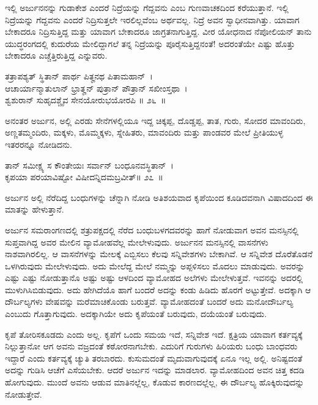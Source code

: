ಇಲ್ಲಿ ಅರ್ಜುನನನ್ನು ಗುಡಾಕೇಶ ಎಂದರೆ ನಿದ್ರೆಯನ್ನು ಗೆದ್ದವನು ಎಂಬ ಗುಣವಾಚಕದಿಂದ ಕರೆಯುತ್ತಾನೆ. ಇಲ್ಲಿ ನಿದ್ರೆಯನ್ನು ಗೆದ್ದವನು ಎಂದರೆ ನಿದ್ರಿಸುತ್ತಲೇ ಇರಲಿಲ್ಲವೆಂಬ ಅರ್ಥವಲ್ಲ. ನಿದ್ರೆ ಅವನ ಸ್ವಾಧೀನವಾಗಿತ್ತು. ಯಾವಾಗ ಬೇಕಾದರೂ ನಿದ್ರಿಸುತ್ತಿದ್ದ ಮತ್ತು ಯಾವಾಗ ಬೇಕಾದರೂ ಜಾಗ್ರತನಾಗುತ್ತಿದ್ದ. ವೀರ ಯೋಧನಾದ ನೆಪೋಲಿಯನ್ ತಾನು ಯುದ್ಧರಂಗದಲ್ಲಿ ಕುದುರೆಯ ಮೇಲಿದ್ದಾಗಲೆ ತನ್ನ ನಿದ್ರೆಯನ್ನು ಪೂರೈಸುತ್ತಿದ್ದನಂತೆ! ಅದರಂತೆಯೇ ಎಷ್ಟು ಹೊತ್ತು ಬೇಕಾದರೂ ಎಚ್ಚೆತ್ತಿರುತ್ತಿದ್ದ ಎನ್ನುವರು.

\begin{shloka}
ತತ್ರಾಪಶ್ಯತ್ ಸ್ಥಿತಾನ್ ಪಾರ್ಥ ಪಿತೄನಥ ಪಿತಾಮಹಾನ್~।\\ಆಚಾರ್ಯಾನ್ಮಾತುಲಾನ್ ಭ್ರಾತೄನ್ ಪುತ್ರಾನ್ ಪೌತ್ರಾನ್ ಸಖೀಂಸ್ತಥಾ~।\\ಶ್ವಶುರಾನ್ ಸುಹೃದಶ್ಚೈವ ಸೇನಯೋರುಭಯೋರಪಿ \hfill॥ ೨೬~॥
\end{shloka}

\begin{artha}
ಅನಂತರ ಅರ್ಜುನ, ಅಲ್ಲಿ ಎರಡು ಸೇನೆಗಳಲ್ಲಿಯೂ ಇದ್ದ ಚಿಕ್ಕಪ್ಪ, ದೊಡ್ಡಪ್ಪ, ತಾತ, ಗುರು, ಸೋದರ ಮಾವಂದಿರು, ಅಣ್ಣತಮ್ಮಂದಿರು, ಮಕ್ಕಳು, ಮೊಮ್ಮಕ್ಕಳು, ಸ್ನೇಹಿತರು, ಮಾವಂದಿರು ಮತ್ತು ಪಾಂಡವರ ಮೇಲೆ ಪ್ರೀತಿಯುಳ್ಳ ಇತರರನ್ನೂ ನೋಡಿದನು.
\end{artha}

\begin{shloka}
ತಾನ್ ಸಮೀಕ್ಷ್ಯ ಸ ಕೌಂತೇಯಃ ಸರ್ವಾನ್ ಬಂಧೂನವಸ್ಥಿತಾನ್~।\\ಕೃಪಯಾ ಪರಯಾವಿಷ್ಟೋ ವಿಷೀದನ್ನಿದಮಬ್ರವೀತ್\hfill॥ ೨೭~॥
\end{shloka}

\begin{artha}
ಅರ್ಜುನ ಅಲ್ಲಿ ನೆರೆದಿದ್ದ ಬಂಧುಗಳನ್ನು ಚೆನ್ನಾಗಿ ನೋಡಿ ಅತಿಶಯವಾದ ಕೃಪೆಯಿಂದ ಕೂಡಿದವನಾಗಿ ವಿಷಾದದಿಂದ ಈ ಮಾತನ್ನು ಹೇಳುತ್ತಾನೆ.
\end{artha}

ಅರ್ಜುನ ಸಮರಾಂಗಣದಲ್ಲಿ ಶತ್ರುಪಕ್ಷದಲ್ಲಿ ನೆರೆದ ಬಂಧುಬಳಗದವರನ್ನು ಹಾಗೆ ನೋಡುವಾಗ ಅವನ ಮನಸ್ಸಿನಲ್ಲಿ ಸುಪ್ತವಾಗಿದ್ದ ಅವರ ಮೇಲಿನ ವ್ಯಾಮೋಹವೆಲ್ಲ ಮೇಲೇಳುವುದು. ಅರ್ಜುನನ ಮನಸ್ಸಿನಲ್ಲಿ ವಾಸನೆಗಳು ನಾಶವಾಗಿರಲಿಲ್ಲ. ಆ ವಾಸನೆಗಳನ್ನು ಮೇಲಕ್ಕೆ ಎಬ್ಬಿಸಲು ಕೆಲವು ಸನ್ನಿವೇಶಗಳು ಬೇಕಾಗಿವೆ. ಆ ಸನ್ನಿವೇಶ ದೊರೆತೊಡನೆ ಒಳಗಿರುವುದು ಮೇಲೇಳುವುದು. ಅದು ಮೇಲೆದ್ದ ಮೇಲೆ ನಮ್ಮನ್ನು ಅಪ್ಪಳಿಸಲು ಮೊದಲು ಮಾಡುವುದು. ಅವರನ್ನು ಎಷ್ಟು ಎಷ್ಟು ನೋಡುತ್ತಾನೊ ಅಷ್ಟು ಅಷ್ಟು ಆಳದಿಂದ ವ್ಯಾಮೋಹದ ಅಲೆಗಳು ಮೇಲೇಳುತ್ತವೆ. ಇವನನ್ನು ಅದರಲ್ಲಿ ಮುಳುಗಿಸಿಬಿಡುವುದು. ಅದು ಹೇಗಿದೆಯೊ ಹಾಗೆ ಬಂದರೆ ಅದನ್ನು ಕಂಡು ಹಿಡಿದು ಹೊರಗೆ ಅಟ್ಟುತ್ತೇವೆ. ಅದಕ್ಕಾಗಿ ಆ ದೌರ್ಬಲ್ಯಗಳು ವೇಷವನ್ನು ಮರೆಮಾಚಿಕೊಂಡು ಬರುತ್ತವೆ. ವ್ಯಾಮೋಹದಂತೆ ಬಂದರೆ ಅದು ಮನೋದೌರ್ಬಲ್ಯ ಎಂಬುದು ಗೊತ್ತಾಗುವುದು. ಅದಕ್ಕಾಗಿಯೇ ಅದು ಕೃಪೆಯಂತೆ ಬರುವುದು, ದಯೆಯಂತೆ ಬರುವುದು.

ಕೃಪೆ ತೋರಿಸಕೂಡದು ಎಂದು ಅಲ್ಲ. ಕೃಪೆಗೆ ಒಂದು ಸಮಯ ಇದೆ, ಸನ್ನಿವೇಶ ಇದೆ. ಕ್ಷತ್ರಿಯ ಯಾವಾಗ ಕರ್ತವ್ಯಕ್ಕೆ ನಿಲ್ಲುತ್ತಾನೋ ಆಗ ಅವನು ವಜ್ರದಂತೆ ಕಠೋರನಾಗಬೇಕು. ಎದುರಿಗೆ ಗುರುಗಳು ಹಿರಿಯರು ಬಂಧು ಬಾಂಧವರು ಇದ್ದಾರೆ ಎಂದು ಕರ್ತವ್ಯಕ್ಕೆ ಚ್ಯುತಿ ತರಬಾರದು. ಕುಸುಮದಂತೆ ಮೃದುವಾಗುವುದಕ್ಕೆ ಏನೂ ಇಲ್ಲ ಅಲ್ಲಿ. ಅನಿಷ್ಟದಂತೆ ಅದನ್ನು ಗುಡಿಸಿ ಆಚೆಗೆ ಎಸೆಯಬೇಕು. ಆದರೆ ಅರ್ಜುನ ಇದನ್ನು ಮಾಡಲಾರ. ವ್ಯಾಮೋಹದಿಂದ ಅವನ ಚಿತ್ತ ಕದಡಿ ಹೋಗುವುದು. ಮುಂದೆ ಅವನು ಆಡುವ ಮಾತಿನಲ್ಲೆಲ್ಲ, ಕೊಡುವ ಕಾರಣದಲ್ಲೆಲ್ಲ, ಈ ದೌರ್ಬಲ್ಯ ಹೊಕ್ಕಿರುವುದನ್ನು ನೋಡುತ್ತೇವೆ.

